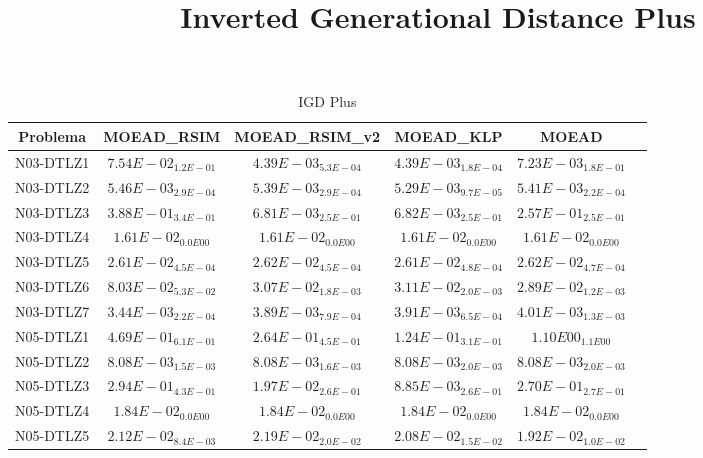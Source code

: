 \documentclass{article}
\title{Inverted Generational Distance Plus}
\author{}
\begin{document}
\maketitle
\begin{table*}[ht!]
\scriptsize
\caption{IGD Plus}
\centering\begin{tabular}{|c||c||c||c||c||c|} \hline
Problema &MOEAD_RSIM &MOEAD_RSIM_v2 &MOEAD_KLP &MOEAD\\\hline
N03-DTLZ1 &$7.54E-02_{1.2E-01}$ &\cellcolor{gray25}$4.39E-03_{5.3E-04}$ &\cellcolor{gray95}$4.39E-03_{1.8E-04}$ &$7.23E-03_{1.8E-01}$\\ 
\hline
N03-DTLZ2 &$5.46E-03_{2.9E-04}$ &\cellcolor{gray25}$5.39E-03_{2.9E-04}$ &\cellcolor{gray95}$5.29E-03_{9.7E-05}$ &$5.41E-03_{2.2E-04}$\\ 
\hline
N03-DTLZ3 &$3.88E-01_{3.4E-01}$ &\cellcolor{gray95}$6.81E-03_{2.5E-01}$ &\cellcolor{gray25}$6.82E-03_{2.5E-01}$ &$2.57E-01_{2.5E-01}$\\ 
\hline
N03-DTLZ4 &\cellcolor{gray95}$1.61E-02_{0.0E00}$ &\cellcolor{gray25}$1.61E-02_{0.0E00}$ &$1.61E-02_{0.0E00}$ &$1.61E-02_{0.0E00}$\\ 
\hline
N03-DTLZ5 &\cellcolor{gray25}$2.61E-02_{4.5E-04}$ &$2.62E-02_{4.5E-04}$ &\cellcolor{gray95}$2.61E-02_{4.8E-04}$ &$2.62E-02_{4.7E-04}$\\ 
\hline
N03-DTLZ6 &$8.03E-02_{5.3E-02}$ &\cellcolor{gray25}$3.07E-02_{1.8E-03}$ &$3.11E-02_{2.0E-03}$ &\cellcolor{gray95}$2.89E-02_{1.2E-03}$\\ 
\hline
N03-DTLZ7 &\cellcolor{gray95}$3.44E-03_{2.2E-04}$ &\cellcolor{gray25}$3.89E-03_{7.9E-04}$ &$3.91E-03_{6.5E-04}$ &$4.01E-03_{1.3E-03}$\\ 
\hline
N05-DTLZ1 &$4.69E-01_{6.1E-01}$ &\cellcolor{gray25}$2.64E-01_{4.5E-01}$ &\cellcolor{gray95}$1.24E-01_{3.1E-01}$ &$1.10E00_{1.1E00}$\\ 
\hline
N05-DTLZ2 &\cellcolor{gray95}$8.08E-03_{1.5E-03}$ &\cellcolor{gray25}$8.08E-03_{1.6E-03}$ &$8.08E-03_{2.0E-03}$ &$8.08E-03_{2.0E-03}$\\ 
\hline
N05-DTLZ3 &$2.94E-01_{4.3E-01}$ &\cellcolor{gray25}$1.97E-02_{2.6E-01}$ &\cellcolor{gray95}$8.85E-03_{2.6E-01}$ &$2.70E-01_{2.7E-01}$\\ 
\hline
N05-DTLZ4 &\cellcolor{gray95}$1.84E-02_{0.0E00}$ &\cellcolor{gray25}$1.84E-02_{0.0E00}$ &$1.84E-02_{0.0E00}$ &$1.84E-02_{0.0E00}$\\ 
\hline
N05-DTLZ5 &$2.12E-02_{8.4E-03}$ &$2.19E-02_{2.0E-02}$ &\cellcolor{gray25}$2.08E-02_{1.5E-02}$ &\cellcolor{gray95}$1.92E-02_{1.0E-02}$\\ 

\end{tabular}
\end{table*}
\end{document}
